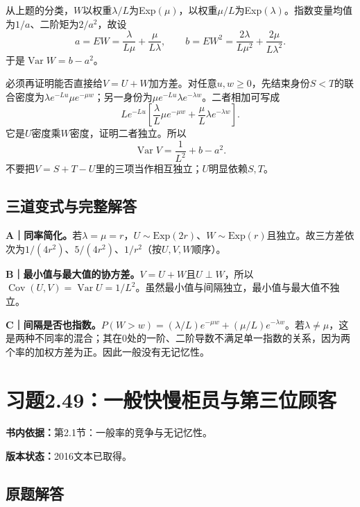 \documentclass[
  11pt,
  a4paper,
  UTF8,fontset=fandol]{ctexart}
\let\OldSection\section
\renewcommand{\section}{\Needspace{7\baselineskip}\OldSection}
\let\OldSubsection\subsection
\renewcommand{\subsection}{\Needspace{5\baselineskip}\OldSubsection}
\begin{document}
从上题的分类，\(W\)以权重\(\lambda/L\)为Exp\((\mu)\)，以权重\(\mu/L\)为Exp\((\lambda)\)。指数变量均值为\(1/a\)、二阶矩为\(2/a^2\)，故设
\[a=EW=\frac\lambda{L\mu}+\frac\mu{L\lambda},\qquad b=EW^2=\frac{2\lambda}{L\mu^2}+\frac{2\mu}{L\lambda^2}.\]
于是\(\boxed{\operatorname{Var}W=b-a^2}\)。

必须再证明能否直接给\(V=U+W\)加方差。对任意\(u,w\ge0\)，先结束身份\(S<T\)的联合密度为\(\lambda e^{-Lu}\mu e^{-\mu w}\)；另一身份为\(\mu e^{-Lu}\lambda e^{-\lambda w}\)。二者相加可写成
\[Le^{-Lu}\left[\frac\lambda L\mu e^{-\mu w}+\frac\mu L\lambda e^{-\lambda w}\right].\]
它是\(U\)密度乘\(W\)密度，证明二者独立。所以
\[\boxed{\operatorname{Var}V=\frac1{L^2}+b-a^2.}\]
不要把\(V=S+T-U\)里的三项当作相互独立；\(U\)明显依赖\(S,T\)。

\subsection{三道变式与完整解答}\label{ux4e09ux9053ux53d8ux5f0fux4e0eux5b8cux6574ux89e3ux7b54-47}

\textbf{A｜同率简化。}若\(\lambda=\mu=r\)，\(U\sim\mathrm{Exp}(2r)\)、\(W\sim\mathrm{Exp}(r)\)且独立。故三方差依次为\(1/(4r^2)\)、\(5/(4r^2)\)、\(1/r^2\)（按\(U,V,W\)顺序）。

\textbf{B｜最小值与最大值的协方差。}\(V=U+W\)且\(U\perp W\)，所以\(\operatorname{Cov}(U,V)=\operatorname{Var}U=1/L^2\)。虽然最小值与间隔独立，最小值与最大值不独立。

\textbf{C｜间隔是否也指数。}\(P(W>w)=(\lambda/L)e^{-\mu w}+(\mu/L)e^{-\lambda w}\)。若\(\lambda\ne\mu\)，这是两种不同率的混合；其在0处的一阶、二阶导数不满足单一指数的关系，因为两个率的加权方差为正。因此一般没有无记忆性。

\newpage

\section{习题2.49：一般快慢柜员与第三位顾客}\label{ux4e60ux98982.49ux4e00ux822cux5febux6162ux67dcux5458ux4e0eux7b2cux4e09ux4f4dux987eux5ba2}

\textbf{书内依据：}第2.1节：一般率的竞争与无记忆性。

\textbf{版本状态：}2016文本已取得。

\subsection{原题解答}\label{ux539fux9898ux89e3ux7b54-48}
\end{document}
